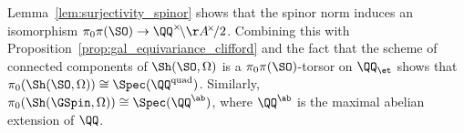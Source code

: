 %
%

\begin{remark}
Lemma~\ref{lem:surjectivity_spinor} shows that the spinor norm induces an isomorphism $\pi_0 \pi(\SO) \rightarrow \QQ^{\times}\!\backslash \AA^{\!\times}\!/2$. Combining this with Proposition~\ref{prop:gal_equivariance_clifford} and the fact that the scheme of connected components of $\Sh(\SO,\Omega)$ is a $\pi_0 \pi(\SO)$-torsor on $\QQ_{\et}$ shows that $\pi_0(\Sh(\SO,\Omega)) \cong \Spec(\QQ^{\text{quad}})$. Similarly, $\pi_0(\Sh(\GSpin,\Omega)) \cong \Spec(\QQ^{\ab})$, where $\QQ^{\ab}$ is the maximal abelian extension of $\QQ$.
\end{remark}

